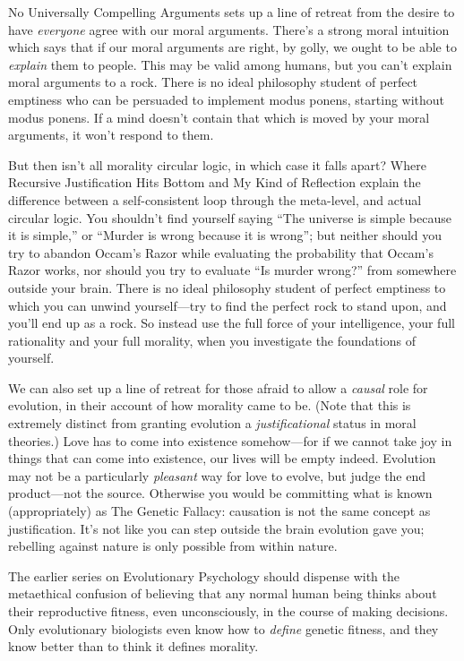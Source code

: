 {
 No Universally Compelling Arguments sets up a line of retreat from
the desire to have \textit{everyone} agree with our moral arguments.
There's a strong moral intuition which says that if our
moral arguments are right, by golly, we ought to be able to
\textit{explain} them to people. This may be valid among humans, but
you can't explain moral arguments to a rock. There is
no ideal philosophy student of perfect emptiness who can be persuaded
to implement modus ponens, starting without modus ponens. If a mind
doesn't contain that which is moved by your moral
arguments, it won't respond to them.}

{
 But then isn't all morality circular logic, in
which case it falls apart? Where Recursive Justification Hits Bottom
and My Kind of Reflection explain the difference between a
self-consistent loop through the meta-level, and actual circular logic.
You shouldn't find yourself saying
``The universe is simple because it is
simple,'' or ``Murder is wrong
because it is wrong''; but neither should you try to
abandon Occam's Razor while evaluating the probability
that Occam's Razor works, nor should you try to
evaluate ``Is murder wrong?'' from
somewhere outside your brain. There is no ideal philosophy student of
perfect emptiness to which you can unwind yourself---try to find the
perfect rock to stand upon, and you'll end up as a
rock. So instead use the full force of your intelligence, your full
rationality and your full morality, when you investigate the
foundations of yourself.}

{
 We can also set up a line of retreat for those afraid to allow a
\textit{causal} role for evolution, in their account of how morality
came to be. (Note that this is extremely distinct from granting
evolution a \textit{justificational} status in moral theories.) Love
has to come into existence somehow---for if we cannot take joy in
things that can come into existence, our lives will be empty indeed.
Evolution may not be a particularly \textit{pleasant} way for love to
evolve, but judge the end product---not the source. Otherwise you would
be committing what is known (appropriately) as The Genetic Fallacy:
causation is not the same concept as justification.
It's not like you can step outside the brain evolution
gave you; rebelling against nature is only possible from within
nature.}

{
 The earlier series on Evolutionary Psychology should dispense with
the metaethical confusion of believing that any normal human being
thinks about their reproductive fitness, even unconsciously, in the
course of making decisions. Only evolutionary biologists even know how
to \textit{define} genetic fitness, and they know better than to think
it defines morality.}

